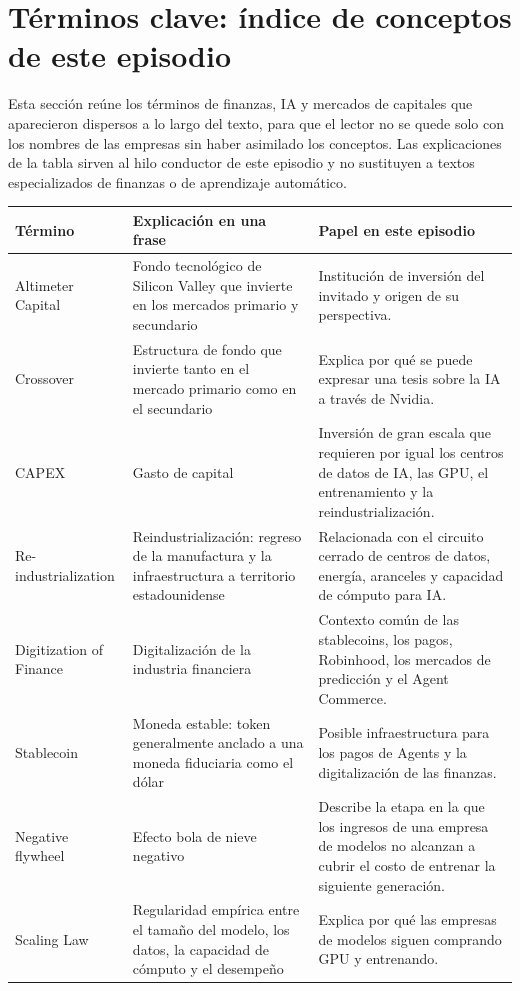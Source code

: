 \section{Términos clave: índice de conceptos de este episodio}

Esta sección reúne los términos de finanzas, IA y mercados de capitales que aparecieron dispersos a lo largo del texto, para que el lector no se quede solo con los nombres de las empresas sin haber asimilado los conceptos. Las explicaciones de la tabla sirven al hilo conductor de este episodio y no sustituyen a textos especializados de finanzas o de aprendizaje automático.

\begin{longtable}{p{}p{}p{}}
\toprule
Término & Explicación en una frase & Papel en este episodio \\
\midrule
Altimeter Capital & Fondo tecnológico de Silicon Valley que invierte en los mercados primario y secundario & Institución de inversión del invitado y origen de su perspectiva. \\
Crossover & Estructura de fondo que invierte tanto en el mercado primario como en el secundario & Explica por qué se puede expresar una tesis sobre la IA a través de Nvidia. \\
CAPEX & Gasto de capital & Inversión de gran escala que requieren por igual los centros de datos de IA, las GPU, el entrenamiento y la reindustrialización. \\
Re-industrialization & Reindustrialización: regreso de la manufactura y la infraestructura a territorio estadounidense & Relacionada con el circuito cerrado de centros de datos, energía, aranceles y capacidad de cómputo para IA. \\
Digitization of Finance & Digitalización de la industria financiera & Contexto común de las stablecoins, los pagos, Robinhood, los mercados de predicción y el Agent Commerce. \\
Stablecoin & Moneda estable: token generalmente anclado a una moneda fiduciaria como el dólar & Posible infraestructura para los pagos de Agents y la digitalización de las finanzas. \\
Negative flywheel & Efecto bola de nieve negativo & Describe la etapa en la que los ingresos de una empresa de modelos no alcanzan a cubrir el costo de entrenar la siguiente generación. \\
Scaling Law & Regularidad empírica entre el tamaño del modelo, los datos, la capacidad de cómputo y el desempeño & Explica por qué las empresas de modelos siguen comprando GPU y entrenando. \\

\end{longtable}
